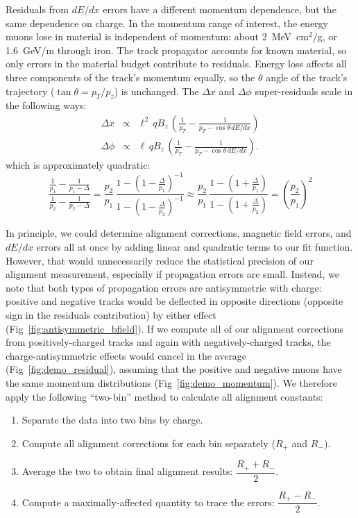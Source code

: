 \documentclass[12pt]{article}
\begin{document}
Residuals from $dE/dx$ errors have a different momentum dependence,
but the same dependence on charge.  In the momentum range of interest,
the energy muons lose in material is independent of momentum: about
2~MeV~cm$^2$/g, or 1.6~GeV/m through iron.  The track propagator
accounts for known material, so only errors in the material budget
contribute to residuals.  Energy loss affects all three components of
the track's momentum equally, so the $\theta$ angle of the track's
trajectory ($\tan\theta = p_T/p_z$) is unchanged.  The $\Delta x$ and
$\Delta \phi$ super-residuals scale in the following ways:
\begin{eqnarray}
\Delta x &\propto& \ell^2 \, q B_z \, \left(\frac{1}{p_T} - \frac{1}{p_T - \cos\theta \, dE/dx}\right) \\
\Delta \phi &\propto& \ell \, q B_z \, \left(\frac{1}{p_T} - \frac{1}{p_T - \cos\theta \, dE/dx}\right) \mbox{.}
\end{eqnarray}
which is approximately quadratic:
\begin{equation}
\frac{\frac{1}{p_1} - \frac{1}{p_1 - \Delta}}{\frac{1}{p_2} - \frac{1}{p_2 - \Delta}}
= \frac{p_2}{p_1} \, \frac{1 - \left(1 - \frac{\Delta}{p_1}\right)^{-1}}{1 - \left(1 - \frac{\Delta}{p_2}\right)^{-1}}
\approx \frac{p_2}{p_1} \, \frac{1 - \left(1 + \frac{\Delta}{p_1}\right)}{1 - \left(1 + \frac{\Delta}{p_2}\right)}
= \left(\frac{p_2}{p_1}\right)^2
\end{equation}

In principle, we could determine alignment corrections, magnetic field
errors, and $dE/dx$ errors all at once by adding linear and quadratic
terms to our fit function.  However, that would unnecessarily reduce
the statistical precision of our alignment measurement, especially if
propagation errors are small.  Instead, we note that both types of
propagation errors are antisymmetric with charge: positive and
negative tracks would be deflected in opposite directions (opposite
sign in the residuals contribution) by either effect
(Fig~\ref{fig:antisymmetric_bfield}).  If we compute all of our
alignment corrections from positively-charged tracks and again with
negatively-charged tracks, the charge-antisymmetric effects would
cancel in the average (Fig~\ref{fig:demo_residual}), assuming that the
positive and negative muons have the same momentum distributions
(Fig~\ref{fig:demo_momentum}).  We therefore apply the following
``two-bin'' method to calculate all alignment constants:
\begin{enumerate}
\item Separate the data into two bins by charge.
\item Compute all alignment corrections for each bin separately ($R_+$ and $R_-$).
\item Average the two to obtain final alignment results: $\dfrac{R_+ + R_-}{2}$.
\item Compute a maximally-affected quantity to trace the errors: $\dfrac{R_+ - R_-}{2}$.
\end{enumerate}
\end{document}
